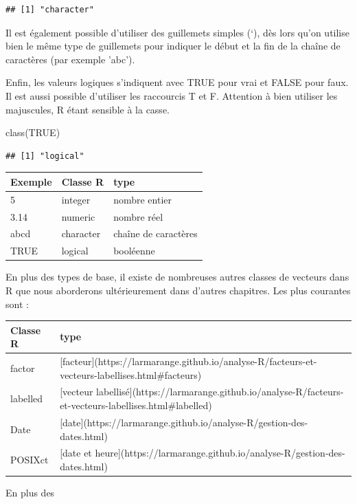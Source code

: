 \documentclass[
]{book}
\newenvironment{Shaded}{\begin{snugshade}}{\end{snugshade}}
\newcommand{\ConstantTok}[1]{\textcolor[rgb]{0.00,0.00,0.00}{#1}}
\newcommand{\FunctionTok}[1]{\textcolor[rgb]{0.00,0.00,0.00}{#1}}
\newcommand{\NormalTok}[1]{#1}
\begin{document}
\begin{verbatim}
## [1] "character"
\end{verbatim}

Il est également possible d'utiliser des guillemets simples (`), dès lors qu'on utilise bien le même type de guillemets pour indiquer le début et la fin de la chaîne de caractères (par exemple 'abc').

Enfin, les valeurs logiques s'indiquent avec TRUE pour vrai et FALSE pour faux. Il est aussi possible d'utiliser les raccourcis T et F. Attention à bien utiliser les majuscules, R étant sensible à la casse.

\begin{Shaded}
\begin{Highlighting}[]
\FunctionTok{class}\NormalTok{(}\ConstantTok{TRUE}\NormalTok{)}
\end{Highlighting}
\end{Shaded}

\begin{verbatim}
## [1] "logical"
\end{verbatim}

\begin{tabular}{l|l|l}
\hline
Exemple & Classe R & type\\
\hline
5 & integer & nombre entier\\
\hline
3.14 & numeric & nombre réel\\
\hline
abcd & character & chaîne de caractères\\
\hline
TRUE & logical & booléenne\\
\hline
\end{tabular}

En plus des types de base, il existe de nombreuses autres classes de vecteurs dans R que nous aborderons ultérieurement dans d'autres chapitres. Les plus courantes sont :

\begin{tabular}{l|l}
\hline
Classe R & type\\
\hline
factor & [facteur](https://larmarange.github.io/analyse-R/facteurs-et-vecteurs-labellises.html\#facteurs)\\
\hline
labelled & [vecteur labellisé](https://larmarange.github.io/analyse-R/facteurs-et-vecteurs-labellises.html\#labelled)\\
\hline
Date & [date](https://larmarange.github.io/analyse-R/gestion-des-dates.html)\\
\hline
POSIXct & [date et heure](https://larmarange.github.io/analyse-R/gestion-des-dates.html)\\
\hline
\end{tabular}

En plus des

  
\end{document}
